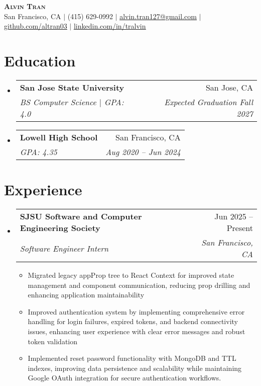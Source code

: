 \documentclass[letterpaper,11pt]{article}
\makeatletter
\newcommand{\resumeItem}[1]{
  \item\small{
    {#1 \vspace{-2pt}}
  }
}
\newcommand{\resumeSubheading}[4]{
  \vspace{-2pt}\item
    \begin{tabular*}{0.97\textwidth}[t]{l@{\extracolsep{\fill}}r}
      \textbf{#1} & #2 \\
      \textit{\small#3} & \textit{\small #4} \\
    \end{tabular*}\vspace{-7pt}
}
\newcommand{\resumeSubHeadingListStart}{\begin{itemize}[leftmargin=0.15in, label={}]}
\newcommand{\resumeSubHeadingListEnd}{\end{itemize}}
\newcommand{\resumeItemListStart}{\begin{itemize}}
\newcommand{\resumeItemListEnd}{\end{itemize}\vspace{-5pt}}
\makeatother
\begin{document}
\begin{center}
    \textbf{\Huge \scshape Alvin Tran} \\ \vspace{1pt}
    \small San Francisco, CA $|$ (415) 629-0992 $|$ \href{mailto:alvin.tran127@gmail.com}{\underline{alvin.tran127@gmail.com}} $|$ 
    \href{https://github.com/altran03}{\underline{github.com/altran03}} $|$
    \href{https://linkedin.com/in/tralvin}{\underline{linkedin.com/in/tralvin}}
\end{center}


\section{Education}
  \resumeSubHeadingListStart
    \resumeSubheading
      {San Jose State University}{San Jose, CA}
      {BS Computer Science $|$ GPA: 4.0}{Expected Graduation Fall 2027}
    \resumeSubheading
      {Lowell High School}{San Francisco, CA}
      {GPA: 4.35}{Aug 2020 -- Jun 2024}
  \resumeSubHeadingListEnd


\section{Experience}
  \resumeSubHeadingListStart

    \resumeSubheading
      {SJSU Software and Computer Engineering Society}{Jun 2025 -- Present}
      {Software Engineer Intern}{San Francisco, CA}
      \resumeItemListStart
        \resumeItem{Migrated legacy appProp tree to React Context for improved state management and component communication, reducing prop drilling and enhancing application maintainability}
        \resumeItem{Improved authentication system by implementing comprehensive error handling for login failures, expired tokens, and backend connectivity issues, enhancing user experience with clear error messages and robust token validation}
        \resumeItem{Implemented reset password functionality with MongoDB and TTL indexes, improving data persistence and scalability while maintaining Google OAuth integration for secure authentication workflows.}
      \resumeItemListEnd

  \resumeSubHeadingListEnd


\end{document}
